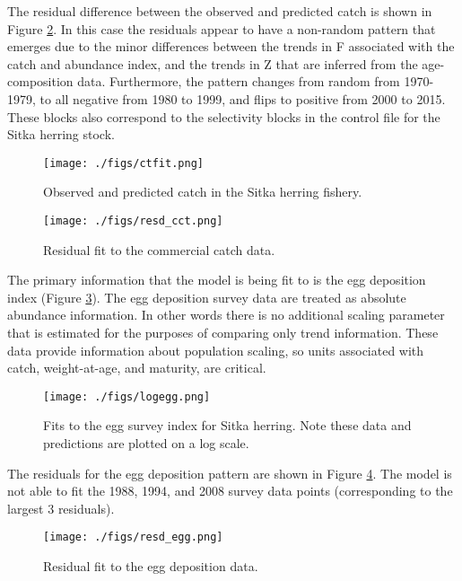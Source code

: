 \documentclass[12pt,letterpaper]{article}
\begin{document}
  The residual difference between the observed and predicted catch is shown in Figure \ref{fig:resd_cct}.  In this case the residuals appear to have a non-random pattern that emerges due to the minor differences between the trends in F associated with the catch and abundance index, and the trends in Z that are inferred from the age-composition data.  Furthermore, the pattern changes from random from 1970-1979, to all negative from 1980 to 1999, and flips to positive from 2000 to 2015.  These blocks also correspond to the selectivity blocks in the control file for the Sitka herring stock.

  \begin{figure}[tb]
    \centering
    \texttt{[image: ./figs/ctfit.png]}
    \caption{Observed and predicted catch in the Sitka herring fishery.}
    \label{fig:ctfit}
  \end{figure}

  \begin{figure}[tb]
    \centering
    \texttt{[image: ./figs/resd\_cct.png]}
    \caption{Residual fit to the commercial catch data.}
    \label{fig:resd_cct}
  \end{figure}

  The primary information that the model is being fit to is the egg deposition index (Figure \ref{fig:logegg}).  The egg deposition survey data are treated as absolute abundance information.  In other words there is no additional scaling parameter that is estimated for the purposes of comparing only trend information.  These data provide information about population scaling, so units associated with catch, weight-at-age, and maturity, are critical.

  \begin{figure}[tb]
    \centering
    \texttt{[image: ./figs/logegg.png]}
    \caption{Fits to the egg survey index for Sitka herring. Note these data and predictions are plotted on a log scale.}
    \label{fig:logegg}
  \end{figure}

  The residuals for the egg deposition pattern are shown in Figure \ref{fig:resd_egg}.  The model is not able to fit the 1988, 1994, and 2008 survey data points (corresponding to the largest 3 residuals).

  \begin{figure}[tb]
    \centering
    \texttt{[image: ./figs/resd\_egg.png]}
    \caption{Residual fit to the egg deposition data.}
    \label{fig:resd_egg}
  \end{figure}
\end{document}
